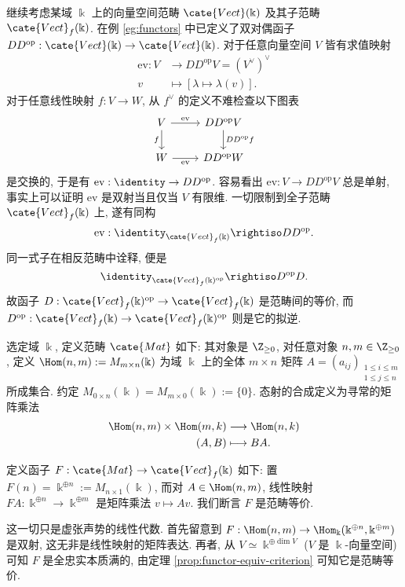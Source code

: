 \begin{example}\label{eg:vectf-duality}
	继续考虑某域 $\Bbbk$ 上的向量空间范畴 $\cate{Vect}(\Bbbk)$ 及其子范畴 $\cate{Vect}_f(\Bbbk)$. 在例 \ref{eg:functors} 中已定义了双对偶函子 $D D^\text{op}: \cate{Vect}(\Bbbk) \to \cate{Vect}(\Bbbk)$. 对于任意向量空间 $V$ 皆有求值映射
	\begin{align*}
		\text{ev}: V & \longrightarrow DD^\text{op} V = (V^\vee)^\vee \\
		v & \longmapsto [\lambda \mapsto \lambda(v)].
	\end{align*}
	对于任意线性映射 $f: V \to W$, 从 $f^\vee$ 的定义不难检查以下图表
	\[\begin{tikzcd}
		V \arrow[r, "\text{ev}"] \ar[d, "f"'] & DD^\text{op} V \arrow[d, "{DD^\text{op} f}"] \\
		W \ar[r, "\text{ev}"'] & DD^\text{op} W
	\end{tikzcd} \]
	是交换的, 于是有 $\text{ev}: \identity \to D D^\text{op}$. 容易看出 $\text{ev}: V \to D D^\text{op} V$ 总是单射, 事实上可以证明 $\text{ev}$ 是双射当且仅当 $V$ 有限维. 一切限制到全子范畴 $\cate{Vect}_f(\Bbbk)$ 上, 遂有同构
	\[ \text{ev}: \identity_{\cate{Vect}_f(\Bbbk)} \rightiso D D^\text{op}. \]
	同一式子在相反范畴中诠释, 便是
	\[ \identity_{\cate{Vect}_f(\Bbbk)^\text{op}} \rightiso D^\text{op} D. \]
	故函子 $D: \cate{Vect}_f(\Bbbk)^\text{op} \to \cate{Vect}_f(\Bbbk)$ 是范畴间的等价, 而 $D^\text{op}: \cate{Vect}_f(\Bbbk) \to \cate{Vect}_f(\Bbbk)^\text{op}$ 则是它的拟逆.
\end{example}

\begin{example}
	选定域 $\Bbbk$, 定义范畴 $\cate{Mat}$ 如下: 其对象是 $\Z_{\geq 0}$, 对任意对象 $n, m \in \Z_{\geq 0}$, 定义 $\Hom(n, m) := M_{m \times n}(\Bbbk)$ 为域 $\Bbbk$ 上的全体 $m \times n$ 矩阵 $A = (a_{ij})_{\substack{1 \leq i \leq m \\ 1 \leq j \leq n}}$ 所成集合. 约定 $M_{0 \times n}(\Bbbk) = M_{m \times 0}(\Bbbk) := \{0\}$. 态射的合成定义为寻常的矩阵乘法
	\begin{align*}
		\Hom(n, m) \times \Hom(m, k) & \longrightarrow \Hom(n, k) \\
		(A, B) & \longmapsto BA .
	\end{align*}

	定义函子 $F: \cate{Mat} \to \cate{Vect}_f(\Bbbk)$ 如下: 置 $F(n) = \Bbbk^{\oplus n} := M_{n \times 1}(\Bbbk)$, 而对 $A \in \Hom(n, m)$, 线性映射 $FA: \Bbbk^{\oplus n} \to \Bbbk^{\oplus m}$ 是矩阵乘法 $v \mapsto Av$. 我们断言 $F$ 是范畴等价.

	这一切只是虚张声势的线性代数. 首先留意到 $F: \Hom(n, m) \to \Hom_\Bbbk(\Bbbk^{\oplus n}, \Bbbk^{\oplus m})$ 是双射, 这无非是线性映射的矩阵表达. 再者, 从 $V \simeq \Bbbk^{\oplus \dim V}$ ($V$ 是 $\Bbbk$-向量空间) 可知 $F$ 是全忠实本质满的, 由定理 \ref{prop:functor-equiv-criterion} 可知它是范畴等价.
\end{example}

